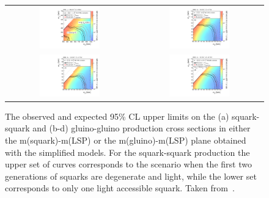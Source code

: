 \begin{figure}[!t]
  \centering
  \begin{tabular}{cc}
                \includegraphics[width=0.49\textwidth]{figures/RA2_Limit1.pdf} &
                \includegraphics[width=0.49\textwidth]{figures/RA2_Limit2.pdf} \\
                \includegraphics[width=0.49\textwidth]{figures/RA2_Limit3.pdf} &
                \includegraphics[width=0.49\textwidth]{figures/RA2_Limit4.pdf} \\
  \end{tabular}
\caption{The observed and expected 95\% CL upper limits on the (a) squark-squark and (b-d) gluino-gluino production cross sections in either the m(squark)-m(LSP) or the m(gluino)-m(LSP) plane obtained with the simplified models. For the squark-squark production the upper set of curves corresponds to the scenario when the first two generations of squarks are degenerate and light, while the lower set corresponds to only one light accessible squark. Taken from~\cite{Chatrchyan:2014lfa}.} 
  \label{fig:ra2_limits}
\end{figure}

